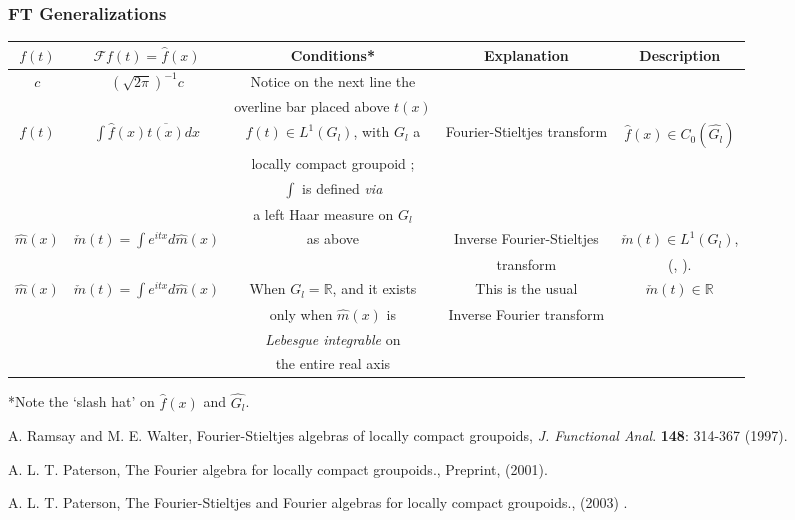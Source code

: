 \documentclass[12pt]{article}
\theoremstyle{plain}
\theoremstyle{definition}
\numberwithin{equation}{section}
\newcommand{\F}{\mathcal F}
\newcommand{\<}{{\langle}}
\begin{document}
\subsubsection*{FT Generalizations}
\begin{center}
\begin{tabular}{|c|c|c|c|c|}
\hline\hline
$f(t)$ & $\F{f(t)} = \hat{f}(x)$ & Conditions* & Explanation & Description \\
\hline
$c$ & $(\sqrt{2 \pi})^{-1}c$ & Notice on the next line the & & \\ 
& & overline bar placed above $t(x)$ & & \\
\hline
$f(t)$ & $\int \hat{f}(x) \overline{t(x)}dx$ & $f(t)\in{L^1(G_l)}$, with $G_l$ a & Fourier-Stieltjes transform & $\hat{f}(x)\in{C_0(\hat{G_l})}$ \\ 
& & locally compact groupoid \cite{RW97}; & & \\
& & $\int $ is defined \emph{via} & & \\
& & a left Haar measure on $G_l$ & & \\
\hline
$\hat{m}(x)$ & $\check{m}(t)= \int e^{itx}d\hat{m}(x)$ & as above & Inverse Fourier-Stieltjes & $\check{m}(t) \in{L^1(G_l)}$, \\
& & & transform & (\cite{PALT2k1}, \cite{PALT2k3}). \\
\hline
$\hat{m}(x)$ & $\check{m}(t) = \int e^{itx}d\hat{m}(x)$ & When $G_l=\mathbb{R}$, and it exists & This is the usual & $\check{m}(t) \in{\mathbb{R}}$ \\ 
& & only when $\hat{m}(x)$ is & Inverse Fourier transform  & \\ 
& & \emph{Lebesgue integrable} on & &  \\
& & the entire real axis & &  \\
\hline\hline


\end{tabular}
\end{center}
*Note the `slash hat' on $\hat{f}(x)$ and $\hat{G_l}$.

\begin{thebibliography}{9}
A. Ramsay and M. E. Walter, Fourier-Stieltjes algebras of locally compact groupoids,
\emph{J. Functional Anal}. \textbf{148}: 314-367 (1997).

A. L. T. Paterson, The Fourier algebra for locally compact groupoids., Preprint, (2001).

A. L. T. Paterson, The Fourier-Stieltjes and Fourier algebras for locally
compact groupoids., (2003) .

\end{thebibliography}
\end{document}
